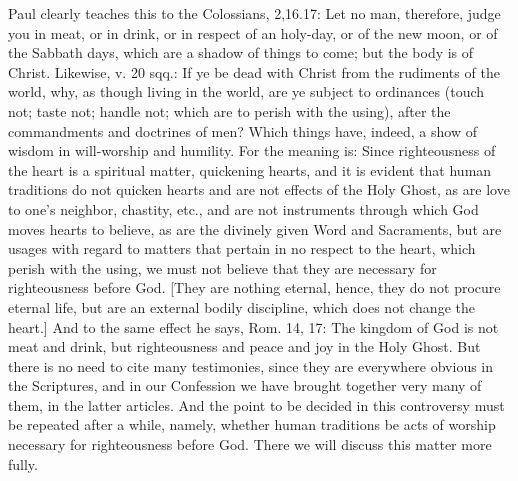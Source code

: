 Paul clearly teaches this to the Colossians, 2,16.17: Let no man,
therefore, judge you in meat, or in drink, or in respect of an
holy-day, or of the new moon, or of the Sabbath days, which are a
shadow of things to come; but the body is of Christ.  Likewise, v. 20
sqq.: If ye be dead with Christ from the rudiments of the world, why,
as though living in the world, are ye subject to ordinances (touch
not; taste not; handle not; which are to perish with the using),
after the commandments and doctrines of men?  Which things have,
indeed, a show of wisdom in will-worship and humility.  For the
meaning is: Since righteousness of the heart is a spiritual matter,
quickening hearts, and it is evident that human traditions do not
quicken hearts and are not effects of the Holy Ghost, as are love to
one's neighbor, chastity, etc., and are not instruments through which
God moves hearts to believe, as are the divinely given Word and
Sacraments, but are usages with regard to matters that pertain in no
respect to the heart, which perish with the using, we must not
believe that they are necessary for righteousness before God.  [They
are nothing eternal, hence, they do not procure eternal life, but are
an external bodily discipline, which does not change the heart.] And
to the same effect he says, Rom. 14, 17: The kingdom of God is not
meat and drink, but righteousness and peace and joy in the Holy Ghost.
But there is no need to cite many testimonies, since they are
everywhere obvious in the Scriptures, and in our Confession we have
brought together very many of them, in the latter articles.  And the
point to be decided in this controversy must be repeated after a
while, namely, whether human traditions be acts of worship necessary
for righteousness before God.  There we will discuss this matter more
fully.

